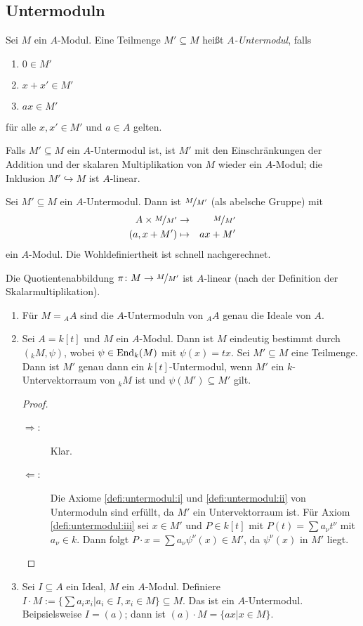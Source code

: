 \documentclass[12pt,a4paper]{scrartcl}
\theoremstyle{cplain}
\theoremstyle{cdef}
\begin{document}
\subsection{Untermoduln}
\begin{defi}
	Sei $M$ ein $A$-Modul. Eine Teilmenge $M'\subseteq M$ heißt \emph{$A$-Untermodul}, falls
	\begin{enumerate}
		\item $0\in M'$ \label{defi:untermodul:i}
		\item $x+x'\in M'$ \label{defi:untermodul:ii}
		\item $ax\in M'$ \label{defi:untermodul:iii}
    \end{enumerate}
    für alle $x,x' \in M'$ und $a \in A$ gelten.

	Falls $M'\subseteq M$ ein $A$-Untermodul ist, ist $M'$ mit den Einschränkungen der Addition und der skalaren Multiplikation von $M$ wieder ein $A$-Modul; die Inklusion $M'\hookrightarrow M$ ist $A$-linear.
	
	Sei $M'\subseteq M$ ein $A$-Untermodul. Dann ist $\nicefrac{M}{M'}$ (als abelsche Gruppe) mit 
	\begin{eqnarray*}
		A\times \nicefrac{M}{M'} & \to & \nicefrac{M}{M'}\\
		(a, x+M') &\mapsto& ax + M'
	\end{eqnarray*}
	ein $A$-Modul. Die Wohldefiniertheit ist schnell nachgerechnet.
	
	Die Quotientenabbildung $\pi\colon M\to \nicefrac{M}{M'}$ ist $A$-linear (nach der Definition der Skalarmultiplikation).
\end{defi}
\begin{bsp}
	\leavevmode
	\begin{enumerate}
		\item Für $M = {}_AA$ sind die $A$-Untermoduln von ${}_AA$ genau die Ideale von $A$.
		\item Sei $A = k[t]$ und $M$ ein $A$-Modul. Dann ist $M$ eindeutig bestimmt durch $({}_kM, \psi)$, wobei $\psi\in\operatorname{End}_k(M)$ mit $\psi(x) = tx$. Sei $M'\subseteq M$ eine Teilmenge. Dann ist $M'$ genau dann ein $k[t]$-Untermodul, wenn $M'$ ein $k$-Untervektorraum von ${}_kM$ ist und $\psi(M')\subseteq M'$ gilt.
		\begin{proof}
		\leavevmode
		\begin{description}
			\item[\glqq $\Rightarrow$\grqq:] Klar.
			\item[\glqq $\Leftarrow$\grqq:]
            Die Axiome \ref{defi:untermodul:i} und \ref{defi:untermodul:ii} von Untermoduln sind erfüllt, da $M'$ ein Untervektorraum ist. Für Axiom \ref{defi:untermodul:iii} sei $x\in M'$ und $P\in k[t]$ mit $P(t) = \sum a_\nu t^\nu$ mit $a_\nu\in k$. Dann folgt $P\cdot x = \sum a_\nu\psi^\nu(x)\in M'$, da $\psi^\nu(x)$ in $M'$ liegt.
            \qedhere
		\end{description}
		\end{proof}
		\item Sei $I\subseteq A$ ein Ideal, $M$ ein $A$-Modul. Definiere $I\cdot M  := \{\sum a_ix_i|a_i\in I, x_i\in M\}\subseteq M$. Das ist ein $A$-Untermodul. Beipsielsweise $I = (a)$; dann ist $(a)\cdot M = \{ax|x\in M\}$.
	\end{enumerate}
\end{bsp}
\end{document}
